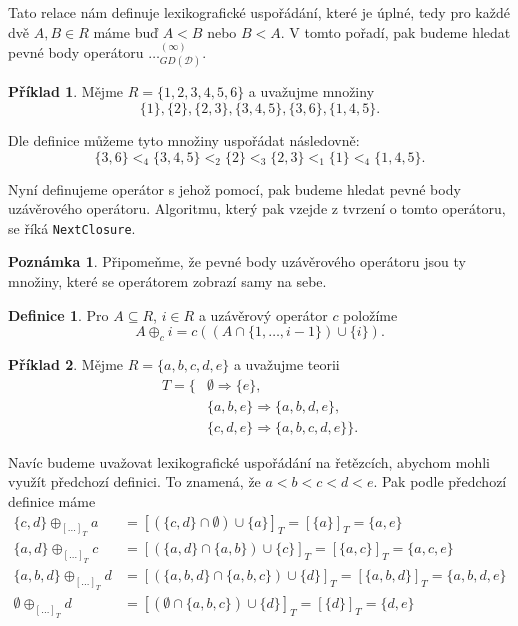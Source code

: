 \documentclass{article}
\theoremstyle {definition}
\newtheorem{definition}{Definice}
\newtheorem{example}{Příklad}
\newtheorem*{remark}{Poznámka}
\begin{document}
Tato relace nám definuje lexikografické uspořádání, které je úplné,
tedy pro každé dvě $A,B\in R$ máme buď $A<B$ nebo $B<A$. V tomto
pořadí, pak budeme hledat pevné body operátoru
$\dots^{(\infty)}_{GD(\mathcal{D})}$.

\begin {example}
  Mějme $R= \{1,2,3,4,5,6\}$ a uvažujme množiny $$\{1\}, \{2\},
  \{2,3\}, \{3,4,5\}, \{3,6\}, \{1,4,5\}.$$

  Dle definice můžeme tyto množiny uspořádat následovně:
  $$ \{3,6\} <_4 \{3,4,5\} <_2 \{2\} <_3 \{2,3\} <_1 \{1\} <_4
  \{1,4,5\}.$$
\end {example}

Nyní definujeme operátor s jehož pomocí, pak budeme hledat pevné body
uzávěrového operátoru. Algoritmu, který pak vzejde z tvrzení o tomto
operátoru, se říká \texttt {NextClosure}.

\begin{remark}
  Připomeňme, že pevné body uzávěrového operátoru
  jsou ty množiny, které se operátorem zobrazí samy na sebe.
\end{remark}

\begin {definition}
  Pro $A\subseteq R$, $i\in R$ a uzávěrový operátor $c$ položíme
  $$ A\oplus_c i = c((A\cap \{1,\dots,i-1\}) \cup \{i\}).$$
\end {definition}

\begin {example}
  Mějme $R= \{a,b,c,d,e\}$ a uvažujme teorii
  \begin{align*}
    T = \{
    &\emptyset\Rightarrow \{e\},\\
    &\{a,b,e\}\Rightarrow \{a,b,d,e\},\\
    &\{c,d,e\}\Rightarrow \{a,b,c,d,e\}\}.
  \end{align*}

  Navíc budeme uvažovat lexikografické uspořádání na řetězcích,
  abychom mohli využít předchozí definici. To znamená, že $a<b<c<d<e$.
  Pak podle předchozí definice máme
  \begin{align*}
    \{c,d\} \oplus_{[\dots]_{T}} a
    &= [(\{c,d\}\cap\emptyset)\cup\{a\}]_{T} =
      [\{a\}]_{T} = \{a,e\} \\
    \{a,d\} \oplus_{[\dots]_{T}} c
    &= [(\{a,d\}\cap\{a,b\})\cup \{c\}]_{T} =
      [\{a,c\}]_{T} = \{a,c,e\} \\
    \{a,b,d\} \oplus_{[\dots]_{T}} d
    &= [(\{a,b,d\}\cap\{a,b,c\})\cup \{d\}]_{T} =
      [\{a,b,d\}]_{T} = \{a,b,d,e\} \\
    \emptyset \oplus_{[\dots]_{T}} d
    &= [(\emptyset\cap\{a,b,c\})\cup \{d\}]_{T} =
      [\{d\}]_{T} = \{d,e\} 
  \end{align*}
\end{example}
\end{document}
